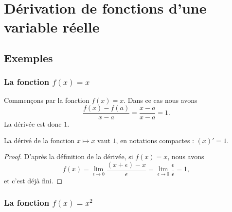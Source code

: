 \section{Dérivation de fonctions d'une variable réelle}

\subsection{Exemples}

\subsubsection{La fonction $f(x)=x$}

Commençons par la fonction $f(x)=x$. Dans ce cas nous avons
\begin{equation}
	\frac{ f(x)-f(a) }{ x-a }=\frac{ x-a }{ x-a }=1.
\end{equation}
La dérivée est donc $1$.

\begin{proposition}
    La dérivé de la fonction $x\mapsto x$ vaut $1$, en notations compactes : $(x)'=1$.
\end{proposition}

\begin{proof}
D'après la définition de la dérivée, si $f(x)=x$, nous avons
\begin{equation}
    f(x)=\lim_{\epsilon\to 0}\frac{ (x+\epsilon) -x }{\epsilon} =\lim_{\epsilon\to 0}\frac{ \epsilon }{\epsilon} =1,
\end{equation}
et c'est déjà fini.
\end{proof}

\subsubsection{La fonction $f(x)=x^2$}

